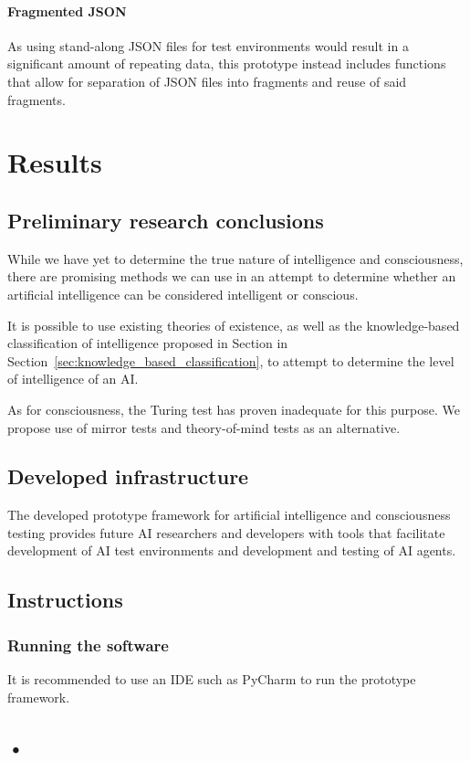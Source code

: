 \documentclass[masterthesis]{fer}
\begin{document}
\subsubsection{Fragmented JSON}
As using stand-along JSON files for test environments would result in a significant amount of repeating data,
this prototype instead includes functions that allow for separation of JSON files into fragments and reuse of said fragments.
\chapter{Results}
\label{sec:results}
\section{Preliminary research conclusions}
While we have yet to determine the true nature of intelligence and consciousness, there are promising methods we can use in an attempt to determine whether an artificial intelligence can be considered intelligent or conscious.

It is possible to use existing theories of existence, as well as the knowledge-based classification of intelligence proposed in Section in Section~\ref{sec:knowledge_based_classification}, to attempt to determine the level of intelligence of an AI. 

As for consciousness, the Turing test has proven inadequate for this purpose. We propose use of mirror tests and theory-of-mind tests as an alternative.
\section{Developed infrastructure}
The developed prototype framework for artificial intelligence and consciousness testing provides future AI researchers and developers with tools that facilitate development of AI test environments and development and testing of AI agents. 
\section{Instructions}
\subsection{Running the software}
It is recommended to use an IDE such as PyCharm to run the prototype framework.
\section{•}
\end{document}
